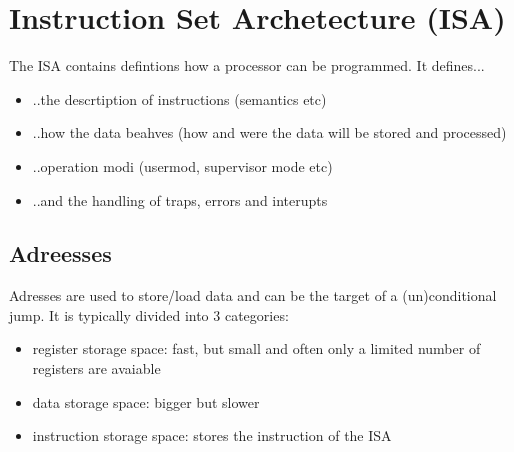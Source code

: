 \documentclass[a4paper]{scrartcl}
\begin{document}
    \section{Instruction Set Archetecture (ISA)}
        The ISA contains defintions how a processor can be programmed. It defines...
        \begin{itemize}
            \item ..the descrtiption of instructions (semantics etc)
            \item ..how the data beahves (how and were the data will be stored and processed)
            \item ..operation modi (usermod, supervisor mode etc)
            \item ..and the handling of traps, errors and interupts 
        \end{itemize}
        \subsection{Adreesses}
            Adresses are used to store/load data and can be the target of a (un)conditional jump. %
            It is typically divided into 3 categories: 
            \begin{itemize}
                \item register storage space: fast, but small and often only a limited number of registers are avaiable  
                \item data storage space: bigger but slower
                \item instruction storage space: stores the instruction of the ISA
            \end{itemize}

\end{document}
